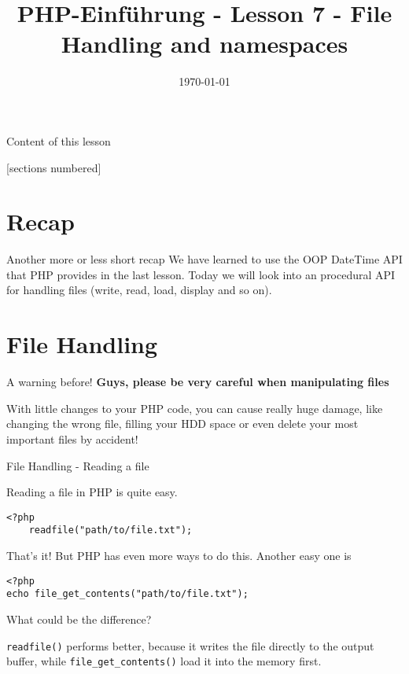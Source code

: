 


\newcommand{\topic}{
	PHP-Einführung - Lesson 7 - File Handling and namespaces
}

\title{\topic}
\date{\today}



\maketitle

\begin{frame}{Content of this lesson}

	[sections numbered]
	\tableofcontents

\end{frame}

\section{Recap}

\begin{frame}{Another more or less short recap}
	We have learned to use the OOP DateTime API that PHP provides in the last lesson. Today we will look into an procedural API for handling files (write, read, load, display and so on).
\end{frame}

\section{File Handling}

\begin{frame}{A warning before!}
	\textbf{Guys, please be very careful when manipulating files}\pause
	
	With little changes to your PHP code, you can cause really huge damage, like changing the wrong file, filling your HDD space or even delete your most important files by accident!
\end{frame}

\begin{frame}[fragile]{File Handling - Reading a file}

Reading a file in PHP is quite easy. \pause
\begin{lstlisting}
<?php
	readfile("path/to/file.txt");
\end{lstlisting} \pause
That's it! But PHP has even more ways to do this. Another easy one is
\begin{lstlisting}
<?php
echo file_get_contents("path/to/file.txt");
\end{lstlisting} \pause

What could be the difference?\pause

\texttt{readfile()} performs better, because it writes the file directly to the output buffer, while \texttt{file\_get\_contents()} load it into the memory first.

\end{frame}

